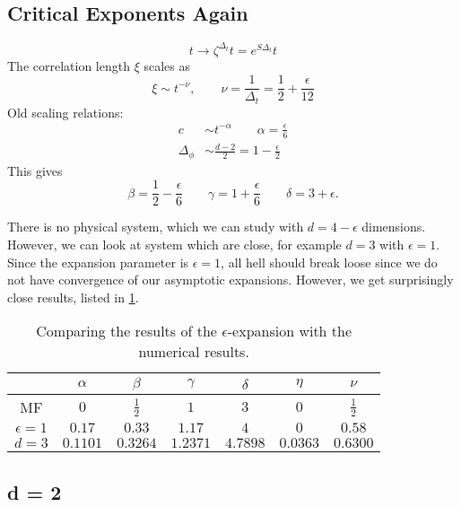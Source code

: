 \subsection{Critical Exponents Again}%
\label{sub:critical_exponents_again}

\begin{equation}
  t \to \zeta^{\Delta_t}t = e^{S \Delta_t}t
\end{equation}
The correlation length $\xi$ scales as
\begin{equation}
  \xi \sim t^{-\nu}, \qquad \nu = \frac{1}{\Delta_t} = \frac{1}{2} + \frac{\epsilon}{12}
\end{equation}
Old scaling relations:
\begin{align}
  c &\sim t^{-\alpha} \qquad \alpha = \frac{\epsilon}{6} \\
  \Delta_\phi &\sim \frac{d-2}{2} = 1 - \frac{\epsilon}{2}
\end{align}
This gives
\begin{equation}
  \beta = \frac{1}{2}- \frac{\epsilon}{6} \qquad \gamma = 1 + \frac{\epsilon}{6} \qquad \delta = 3 + \epsilon.
\end{equation}

There is no physical system, which we can study with $d = 4-\epsilon$ dimensions.
However, we can look at system which are close, for example $d = 3$ with $\epsilon = 1$. Since the expansion parameter is $\epsilon = 1$, all hell should break loose since we do not have convergence of our asymptotic expansions.
However, we get surprisingly close results, listed in \ref{tab:epsilon-1}.

\begin{table}[htpb]
  \centering
  \caption{Comparing the results of the $\epsilon$-expansion with the numerical results.}
  \label{tab:epsilon-1}
  \begin{tabular}{c | c c c c c c}
     & $\alpha$ & $\beta$ & $\gamma$ & $\delta$ & $\eta$ & $\nu$ \\
     \hline
    MF & $0$ & $\frac{1}{2}$ & $1$ & $3$ & $0$ & $\frac{1}{2}$ \\
    $\epsilon = 1$ & $0.17$ & $0.33$ & $1.17$ & $4$ & $0$ & $0.58$ \\
    $d = 3$ & $0.1101$ & $0.3264$ & $1.2371$ & $4.7898$ & $0.0363$ & $0.6300$ \\
  \end{tabular}
\end{table}

\subsection*{d = 2}%

